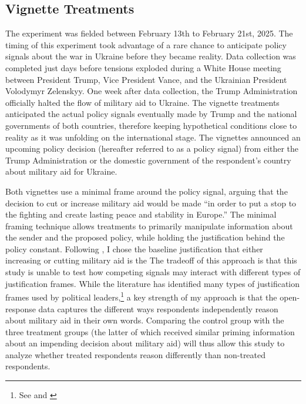 \subsection{Vignette Treatments}
The experiment was fielded between February 13th to February 21st, 2025. The timing of this experiment took advantage of a rare chance to anticipate policy signals about the war in Ukraine before they became reality. Data collection was completed just days before tensions exploded during a White House meeting between President Trump, Vice President Vance, and the Ukrainian President Volodymyr Zelenskyy. One week after data collection, the Trump Administration officially halted the flow of military aid to Ukraine. The vignette treatments anticipated the actual policy signals eventually made by Trump and the national governments of both countries, therefore keeping hypothetical conditions close to reality as it was unfolding on the international stage. The vignettes announced an upcoming policy decision (hereafter referred to as a policy signal) from either the Trump Administration or the domestic government of the respondent's country about military aid for Ukraine. 

Both vignettes use a minimal frame around the policy signal, arguing that the decision to cut or increase military aid would be made \enquote{in order to put a stop to the fighting and create lasting peace and stability in Europe.} The minimal framing technique allows treatments to primarily manipulate information about the sender and the proposed policy, while holding the justification behind the policy constant. Following \textcite{levendusky_when_2012}, I chose the baseline justification that either increasing or cutting military aid is the  The tradeoff of this approach is that this study is unable to test how competing signals may interact with different types of justification frames. While the literature has identified many types of justification frames used by political leaders,\footnote{See \textcite{reiter_manipulating_2024} and \textcite{xu_reneging_2023}} a key strength of my approach is that the open-response data captures the different ways respondents independently reason about military aid in their own words. Comparing the control group with the three treatment groups (the latter of which received similar priming information about an impending decision about military aid) will thus allow this study to analyze whether treated respondents reason differently than non-treated respondents. 

